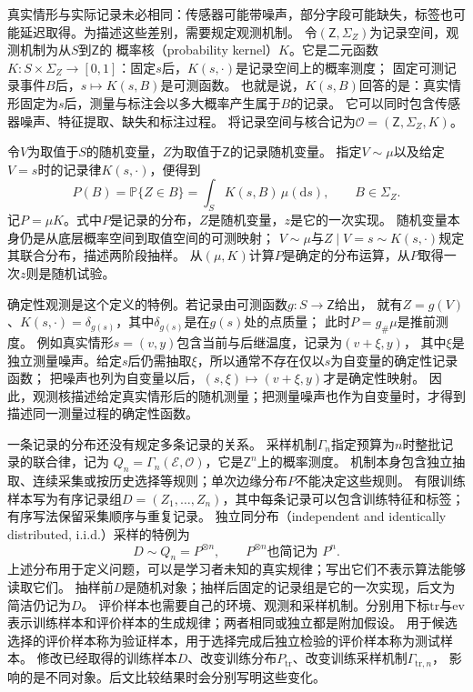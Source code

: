 真实情形与实际记录未必相同：传感器可能带噪声，部分字段可能缺失，标签也可能延迟取得。为描述这些差别，需要规定观测机制。
令$(\mathsf Z,\Sigma_Z)$为记录空间，观测机制为从$S$到$\mathsf Z$的
概率核（probability kernel）$K$。它是二元函数
$K:S\times\Sigma_Z\to[0,1]$：固定$s$后，$K(s,\cdot)$是记录空间上的概率测度；
固定可测记录事件$B$后，$s\mapsto K(s,B)$是可测函数。
也就是说，$K(s,B)$回答的是：真实情形固定为$s$后，测量与标注会以多大概率产生属于$B$的记录。
它可以同时包含传感器噪声、特征提取、缺失和标注过程。
将记录空间与核合记为$\mathcal O=(\mathsf Z,\Sigma_Z,K)$。

令$V$为取值于$S$的随机变量，$Z$为取值于$\mathsf Z$的记录随机变量。
指定$V\sim\mu$以及给定$V=s$时的记录律$K(s,\cdot)$，便得到
\begin{equation}
  P(B)=\mathbb P\{Z\in B\}
      =\int_S K(s,B)\,\mu(\mathrm ds),
  \qquad B\in\Sigma_Z.
  \label{eq:future-observation-law}
\end{equation}
记$P=\mu K$。式中$P$是记录的分布，$Z$是随机变量，$z$是它的一次实现。
随机变量本身仍是从底层概率空间到取值空间的可测映射；
$V\sim\mu$与$Z\mid V=s\sim K(s,\cdot)$规定其联合分布，描述两阶段抽样。
从$(\mu,K)$计算$P$是确定的分布运算，从$P$取得一次$z$则是随机试验。

确定性观测是这个定义的特例。若记录由可测函数$g:S\to\mathsf Z$给出，
就有$Z=g(V)$、$K(s,\cdot)=\delta_{g(s)}$，其中$\delta_{g(s)}$是在$g(s)$处的点质量；
此时$P=g_{\#}\mu$是推前测度。
例如真实情形$s=(v,y)$包含当前与后继温度，记录为$(v+\xi,y)$，
其中$\xi$是独立测量噪声。给定$s$后仍需抽取$\xi$，所以通常不存在仅以$s$为自变量的确定性记录函数；
把噪声也列为自变量以后，$(s,\xi)\mapsto(v+\xi,y)$才是确定性映射。
因此，观测核描述给定真实情形后的随机测量；把测量噪声也作为自变量时，才得到描述同一测量过程的确定性函数。

一条记录的分布还没有规定多条记录的关系。
采样机制$\Gamma_n$指定预算为$n$时整批记录的联合律，记为
$Q_n=\Gamma_n(\mathcal E,\mathcal O)$，它是$\mathsf Z^n$上的概率测度。
机制本身包含独立抽取、连续采集或按历史选择等规则；单次边缘分布$P$不能决定这些规则。
有限训练样本写为有序记录组$D=(Z_1,\ldots,Z_n)$，其中每条记录可以包含训练特征和标签；有序写法保留采集顺序与重复记录。
独立同分布（independent and identically distributed, i.i.d.）采样的特例为
\begin{equation}
  D\sim Q_n=P^{\otimes n},\qquad P^{\otimes n}\text{也简记为 }P^n.
  \label{eq:future-sampling-law}
\end{equation}
上述分布用于定义问题，可以是学习者未知的真实规律；写出它们不表示算法能够读取它们。
抽样前$D$是随机对象；抽样后固定的记录组是它的一次实现，后文为简洁仍记为$D$。
评价样本也需要自己的环境、观测和采样机制。分别用下标$\mathrm{tr}$与$\mathrm{ev}$
表示训练样本和评价样本的生成规律；两者相同或独立都是附加假设。
用于候选选择的评价样本称为验证样本，用于选择完成后独立检验的评价样本称为测试样本。
修改已经取得的训练样本$D$、改变训练分布$P_{\mathrm{tr}}$、改变训练采样机制$\Gamma_{\mathrm{tr},n}$，
影响的是不同对象。后文比较结果时会分别写明这些变化。

